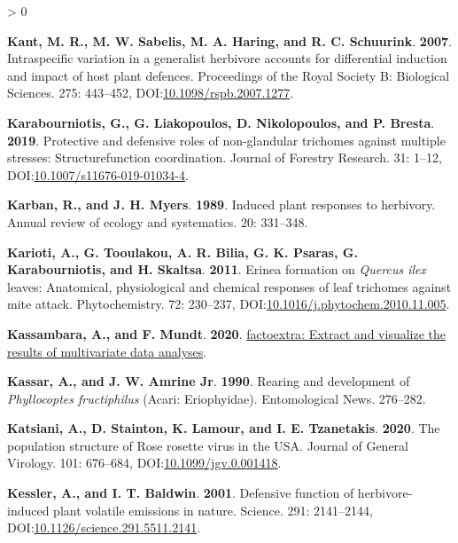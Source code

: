 \documentclass{ufdissertation}[overrideChapters] %
\newlength{\cslhangindent}
\newenvironment{CSLReferences}[2] %
 {%
  \setlength{\parindent}{0pt}
  \ifodd #1 \everypar{\setlength{\hangindent}{\cslhangindent}}\ignorespaces\fi
  \ifnum #2 > 0
  \setlength{\parskip}{#2\baselineskip}
  \fi
 }%
 {}
\begin{document}
{\begin{CSLReferences}{1}{1}
\leavevmode{}%
\textbf{Kant, M. R., M. W. Sabelis, M. A. Haring, and R. C. Schuurink}. \textbf{2007}. Intraspecific variation in a generalist herbivore accounts for differential induction and impact of host plant defences. Proceedings of the Royal Society B: Biological Sciences. 275: 443--452, DOI:\href{https://doi.org/10.1098/rspb.2007.1277}{10.1098/rspb.2007.1277}.

\leavevmode{}%
\textbf{Karabourniotis, G., G. Liakopoulos, D. Nikolopoulos, and P. Bresta}. \textbf{2019}. Protective and defensive roles of non-glandular trichomes against multiple stresses: Structure{\textendash}function coordination. Journal of Forestry Research. 31: 1--12, DOI:\href{https://doi.org/10.1007/s11676-019-01034-4}{10.1007/s11676-019-01034-4}.

\leavevmode{}%
\textbf{Karban, R., and J. H. Myers}. \textbf{1989}. Induced plant responses to herbivory. Annual review of ecology and systematics. 20: 331--348.

\leavevmode{}%
\textbf{Karioti, A., G. Tooulakou, A. R. Bilia, G. K. Psaras, G. Karabourniotis, and H. Skaltsa}. \textbf{2011}. Erinea formation on {\emph{Quercus ilex}} leaves: Anatomical, physiological and chemical responses of leaf trichomes against mite attack. Phytochemistry. 72: 230--237, DOI:\href{https://doi.org/10.1016/j.phytochem.2010.11.005}{10.1016/j.phytochem.2010.11.005}.

\leavevmode{}%
\textbf{Kassambara, A., and F. Mundt}. \textbf{2020}. \href{https://CRAN.R-project.org/package=factoextra}{{factoextra}: Extract and visualize the results of multivariate data analyses}.

\leavevmode{}%
\textbf{Kassar, A., and J. W. Amrine Jr}. \textbf{1990}. Rearing and development of {\emph{Phyllocoptes fructiphilus}} ({Acari}: {Eriophyidae}). Entomological News. 276--282.

\leavevmode{}%
\textbf{Katsiani, A., D. Stainton, K. Lamour, and I. E. Tzanetakis}. \textbf{2020}. The population structure of {Rose rosette virus} in the {USA}. Journal of General Virology. 101: 676--684, DOI:\href{https://doi.org/10.1099/jgv.0.001418}{10.1099/jgv.0.001418}.

\leavevmode{}%
\textbf{Kessler, A., and I. T. Baldwin}. \textbf{2001}. Defensive function of herbivore-induced plant volatile emissions in nature. Science. 291: 2141--2144, DOI:\href{https://doi.org/10.1126/science.291.5511.2141}{10.1126/science.291.5511.2141}.


\end{CSLReferences}}
\end{document}
